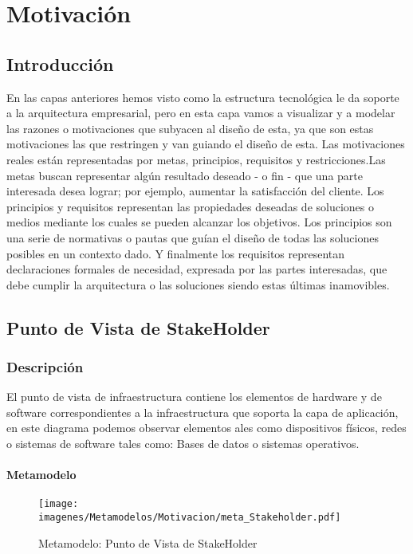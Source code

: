 \chapter{Motivación}


\section{Introducción}
En las capas anteriores hemos visto como la estructura tecnológica le da soporte a la arquitectura empresarial, pero en esta capa vamos a visualizar y a modelar las razones o motivaciones que subyacen al diseño de esta, ya que son estas motivaciones las que restringen y van guiando el diseño de esta.
Las motivaciones reales están representadas por metas, principios, requisitos y restricciones.Las metas buscan representar algún resultado deseado - o fin - que una parte interesada desea lograr; por ejemplo, aumentar la satisfacción del cliente. 
Los principios y requisitos representan las propiedades deseadas de soluciones  o medios  mediante los cuales se pueden alcanzar los objetivos. 
Los principios son una serie de normativas  o pautas que guían el diseño de todas las soluciones posibles en un contexto dado. Y finalmente los requisitos representan declaraciones formales de necesidad, expresada por las partes interesadas, que debe cumplir la arquitectura o las soluciones siendo estas últimas inamovibles.


\section{Punto de Vista de StakeHolder}
\subsection{Descripción}
El punto de vista de infraestructura contiene los elementos de hardware y de software correspondientes a la infraestructura que soporta la capa de aplicación, en este diagrama podemos observar elementos ales como dispositivos físicos, redes o sistemas de software tales como: Bases de datos o sistemas operativos.

\subsubsection{Metamodelo}
\begin{figure}[H]
	\centering
	\texttt{[image: imagenes/Metamodelos/Motivacion/meta\_Stakeholder.pdf]}
	\caption{Metamodelo: Punto de Vista de StakeHolder}
	\label{fig:gap_analysis}
\end{figure}

